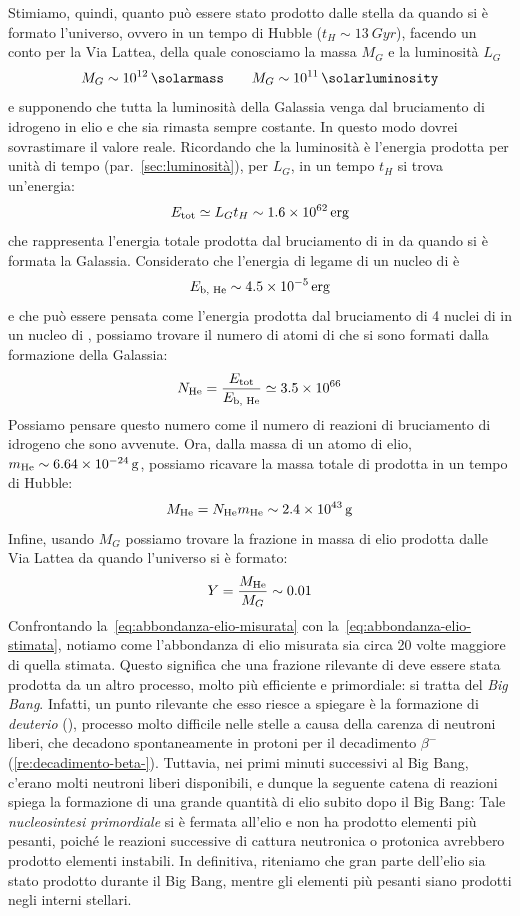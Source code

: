 Stimiamo, quindi, quanto  può essere stato prodotto dalle stella da quando si è formato l'universo, ovvero in un tempo di Hubble ($t_H \sim \SI{13}{Gyr}$), facendo un conto per la Via Lattea, della quale conosciamo la massa $M_G$ e la luminosità $L_G$
\[
M_G \sim \SI{e12}{\solarmass} \qquad M_G \sim \SI{e11}{\solarluminosity}
\]
e supponendo che tutta la luminosità della Galassia venga dal bruciamento di idrogeno in elio e che sia rimasta sempre costante. In questo modo dovrei sovrastimare il valore reale. Ricordando che la luminosità è l'energia prodotta per unità di tempo (par.~\ref{sec:luminosità}), per $L_G$, in un tempo $t_H$ si trova un'energia:
\[
E_\textup{tot} \simeq L_G t_H \sim \SI{1.6e62}{erg}
\]
che rappresenta l'energia totale prodotta dal bruciamento di  in  da quando si è formata la Galassia. Considerato che l'energia di legame di un nucleo di  è
\[
E_\textup{b, He} \sim \SI{4.5e-5}{erg}
\]
e che può essere pensata come l'energia prodotta dal bruciamento di 4 nuclei di  in un nucleo di , possiamo trovare il numero di atomi di  che si sono formati dalla formazione della Galassia:
\[
N_\textup{He} = \frac{E_\textup{tot}}{E_\textup{b, He}} \simeq \SI{3.5e66}{}
\]
Possiamo pensare questo numero come il numero di reazioni di bruciamento di idrogeno che sono avvenute. Ora, dalla massa di un atomo di elio, $m_\textup{He} \sim \SI{6.64e-24}{g}$, possiamo ricavare la massa totale di  prodotta in un tempo di Hubble:
\[
M_\textup{He} = N_\textup{He} m_\textup{He} \sim \SI{2.4e43}{g}
\]
Infine, usando $M_G$ possiamo trovare la frazione in massa di elio prodotta dalle Via Lattea da quando l'universo si è formato:
\begin{equation}\label{eq:abbondanza-elio-stimata}
Y = \frac{M_\textup{He}}{M_G} \sim 0.01
\end{equation}
Confrontando la~\eqref{eq:abbondanza-elio-misurata} con la~\eqref{eq:abbondanza-elio-stimata}, notiamo come l'abbondanza di elio misurata sia circa 20 volte maggiore di quella stimata. Questo significa che una frazione rilevante di  deve essere stata prodotta da un altro processo, molto più efficiente e primordiale: si tratta del \emph{Big Bang}. Infatti, un punto rilevante che esso riesce a spiegare è la formazione di \emph{deuterio} (), processo molto difficile nelle stelle a causa della carenza di neutroni liberi, che decadono spontaneamente in protoni per il decadimento $\beta^-$ (\ref{re:decadimento-beta-}). Tuttavia, nei primi minuti successivi al Big Bang, c'erano molti neutroni liberi disponibili, e dunque la seguente catena di reazioni spiega la formazione di una grande quantità di elio subito dopo il Big Bang:
Tale \emph{nucleosintesi primordiale} si è fermata all'elio e non ha prodotto elementi più pesanti, poiché le reazioni successive di cattura neutronica o protonica avrebbero prodotto elementi instabili. In definitiva, riteniamo che gran parte dell'elio sia stato prodotto durante il Big Bang, mentre gli elementi più pesanti siano prodotti negli interni stellari.
 
